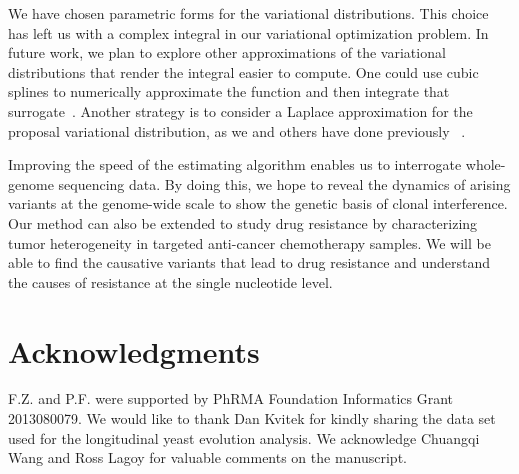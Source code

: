 \documentclass[11pt,reqno]{amsart}
\begin{document}
We have chosen parametric forms for the variational distributions.
This choice has left us with a complex integral in our variational optimization problem.
In future work, we plan to explore other approximations of the variational distributions that render the integral easier to compute.
One could use cubic splines to numerically approximate the function and then integrate that surrogate~\citet{mckinley1998cubic}.
Another strategy is to consider a Laplace approximation for the proposal variational distribution, as we and others have done previously ~\citep{saddiki2014glad, wang2013variational}.


Improving the speed of the estimating algorithm enables us to interrogate whole-genome sequencing data.
By doing this, we hope to reveal the dynamics of arising variants at the genome-wide scale to show the genetic basis of clonal interference.
Our method can also be extended to study drug resistance by characterizing tumor heterogeneity in targeted anti-cancer chemotherapy samples.
We will be able to find the causative variants that lead to drug resistance and understand the causes of resistance at the single nucleotide level.

\section{Acknowledgments}
F.Z. and P.F. were supported by PhRMA Foundation Informatics Grant 2013080079.
We would like to thank Dan Kvitek for kindly sharing the data set used for the longitudinal yeast evolution analysis.
We acknowledge Chuangqi Wang and Ross Lagoy for valuable comments on the manuscript.
%
\appendix
\end{document}
